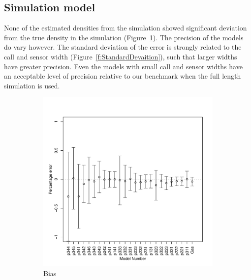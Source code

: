 \documentclass[a4paper,10pt,reqno,oneside]{amsart}
\begin{document}
\subsection{Simulation model}

None of the estimated densities from the simulation showed significant deviation from the true density in the simulation (Figure~\ref{f:ModelBias}). The precision of the models do vary however. The standard deviation of the error is strongly related to the call and sensor width (Figure~\ref{f:StandardDevaition}), such that larger widths have greater precision. Even the models with small call and sensor widths have an acceptable level of precision relative to our benchmark when the full length simulation is used. 

\begin{figure}
	\centering
	\begin{subfigure}[t]{0.5\textwidth}
	\includegraphics[width=1\textwidth]{imgs/AverageModelBias.pdf}
	\caption{Bias}
	\label{f:ModelBias}
	\end{subfigure}
	~
	\begin{subfigure}[t]{0.5\textwidth}

\end{subfigure}
\end{figure}
\end{document}
